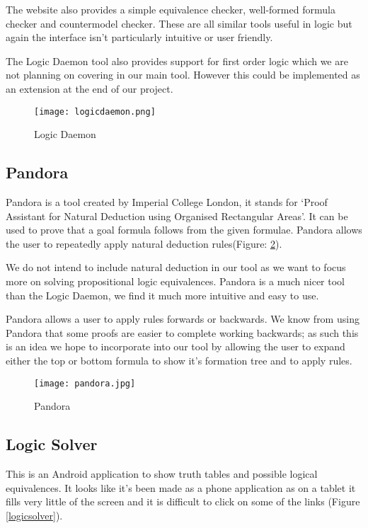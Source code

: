 \documentclass{report}
\begin{document}
The website also provides a simple equivalence checker, well-formed formula checker and countermodel checker. These are all similar tools useful in logic but again the interface isn't particularly intuitive or user friendly.

The Logic Daemon tool also provides support for first order logic which we are not planning on covering in our main tool. However this could be implemented as an extension at the end of our project.

\begin{figure}[ht]
    \centering
    \texttt{[image: logicdaemon.png]}
    \caption{Logic Daemon}
    \label{logicdaemon}
\end{figure}

\subsection{Pandora}

Pandora\cite{pandora} is a tool created by Imperial College London, it stands for `Proof Assistant for Natural Deduction using Organised Rectangular Areas'. It can be used to prove that a goal formula follows from the given formulae. Pandora allows the user to repeatedly apply natural deduction rules(Figure: \ref{pandora}).

We do not intend to include natural deduction in our tool as we want to focus more on solving propositional logic equivalences. Pandora is a much nicer tool than the Logic Daemon, we find it much more intuitive and easy to use.

Pandora allows a user to apply rules forwards or backwards. We know from using Pandora that some proofs are easier to complete working backwards; as such this is an idea we hope to incorporate into our tool by allowing the user to expand either the top or bottom formula to show it's formation tree and to apply rules. 

\begin{figure}[ht]
    \centering
    \texttt{[image: pandora.jpg]}
    \caption{Pandora}
    \label{pandora}
\end{figure}

\subsection{Logic Solver}

This is an Android application to show truth tables and possible logical equivalences. It looks like it's been made as a phone application as on a tablet it fills very little of the screen and it is difficult to click on some of the links (Figure \ref{logicsolver}).
\end{document}
